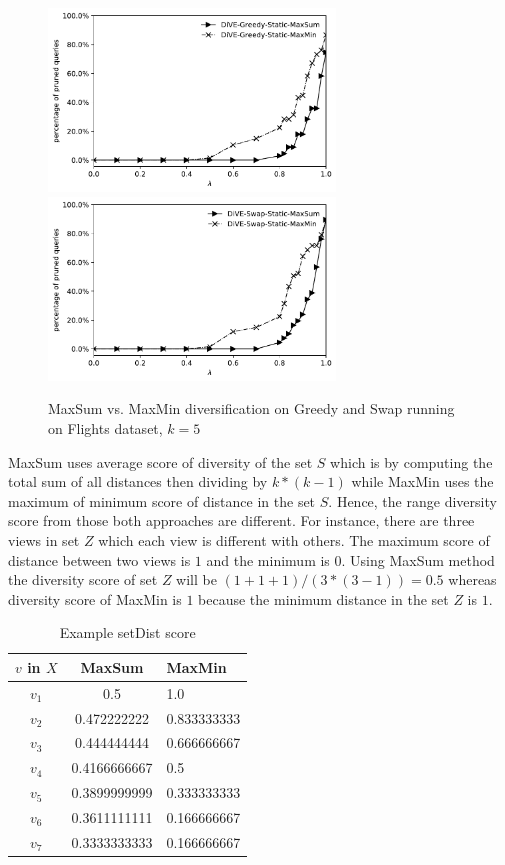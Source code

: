 \documentclass{article}
\begin{document}
\begin{figure}
	\begin{center}
		\includegraphics[width=3.0in]{figures/MaxSum_MaxMin_Greedy}
		\includegraphics[width=3.0in]{figures/MaxSum_MaxMin_Swap}
		\caption{MaxSum vs. MaxMin diversification on Greedy and Swap running on Flights dataset, $k = 5$}
		\label{fig:maxsum-maxmin-greedy-swap}
	\end{center}
\end{figure}


MaxSum uses average score of diversity of the set $ S $ which is by computing the total sum of all distances then dividing by $ k*(k-1) $ while MaxMin uses the maximum of minimum score of distance in the set $ S $.  Hence, the range diversity score from those both approaches are different. For instance, there are three views in set $ Z $ which each view is different with others. The maximum score of distance between two views is $ 1 $ and the minimum is $ 0 $. Using MaxSum method the diversity score of set $ Z $ will be $ (1+1+1)/(3*(3-1)) = 0.5 $ whereas diversity score of MaxMin is $ 1 $ because the minimum distance in the set $ Z $ is $ 1 $. 

\begin{table}
	\begin{center}
	\caption{Example setDist score}
	\label{tab:setDist-score}
	\begin{tabular}{ccl}
		\toprule
		$ v $ in $ X $ &MaxSum &MaxMin\\
		\midrule
		$ v_1 $ & 0.5 & 1.0\\
		$ v_2 $ & 0.472222222 & 0.833333333\\
		$ v_3 $ & 0.444444444 & 0.666666667\\
		$ v_4 $ & 0.4166666667 & 0.5\\
		$ v_5 $ & 0.3899999999 & 0.333333333\\
		$ v_6 $ & 0.3611111111 & 0.166666667\\
		$ v_7 $ & 0.3333333333 & 0.166666667\\
		\bottomrule
	\end{tabular}
	\end{center}
\end{table}
\end{document}
